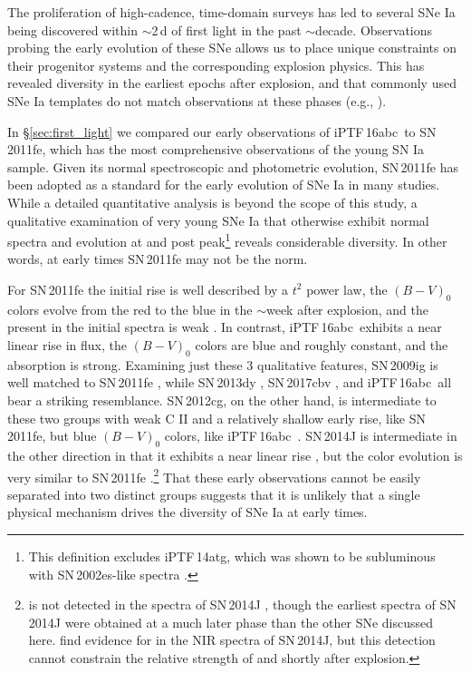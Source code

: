 \documentclass[twocolumn]{aastex61}
\newcommand{\abc}{iPTF\,16abc}
\begin{document}
The proliferation of high-cadence, time-domain surveys has led to several SNe
Ia being discovered within $\sim$2\,d of first light in the past $\sim$decade.
Observations probing the early evolution of these SNe allows us to place
unique constraints on their progenitor systems and the corresponding explosion
physics. This has revealed diversity in the earliest epochs after explosion,
and that commonly used SNe Ia templates do not match observations at these
phases (e.g., \citealt{2012ApJ...744...38F}).

In \S\ref{sec:first_light} we compared our early observations of \abc\ to
SN\,2011fe, which has the most comprehensive observations of the young SN Ia
sample. Given its normal spectroscopic and photometric evolution, SN\,2011fe
has been adopted as a standard for the early evolution of SNe Ia in many
studies. While a detailed quantitative analysis is beyond the scope of this
study, a qualitative examination of very young SNe Ia that otherwise exhibit
normal spectra and evolution at and post peak\footnote{This definition
excludes iPTF\,14atg, which was shown to be subluminous with SN\,2002es-like
spectra \citep{2015Natur.521..328C}.} reveals considerable diversity. In other
words, at early times SN\,2011fe may not be the norm.

For SN\,2011fe the initial rise is well described by a $t^2$ power law, the
$(B - V)_0$ colors evolve from the red to the blue in the $\sim$week after
explosion, and the  present in the initial spectra is weak
\citep{2011Natur.480..344N,2016ApJ...820...67Z,2012ApJ...752L..26P}. In
contrast, \abc\ exhibits a near linear rise in flux, the $(B - V)_0$ colors
are blue and roughly constant, and the  absorption is strong.
Examining just these 3 qualitative features, SN\,2009ig is well matched to
SN\,2011fe \citep{2012ApJ...744...38F}, while SN\,2013dy
\citep{2013ApJ...778L..15Z}, SN\,2017cbv \citep{2017ApJ...845L..11H}, and
\abc\ all bear a striking resemblance. SN\,2012cg, on the other hand, is
intermediate to these two groups with weak C II and a relatively shallow early
rise, like SN\,2011fe, but blue $(B - V)_0$ colors, like \abc\
\citep{2012ApJ...756L...7S,2016ApJ...820...92M}. SN\,2014J is intermediate in
the other direction in that it exhibits a near linear rise
\citep{2014ApJ...783L..24Z,2015ApJ...799..106G}, but the color evolution is
very similar to SN\,2011fe \citep{2014ApJ...788L..21A}.\footnote{\ion{C}{2} is
not detected in the spectra of SN\,2014J
\citep{2014ApJ...784L..12G,2014ApJ...783L..24Z}, though the earliest spectra
of SN\,2014J were obtained at a much later phase than the other SNe discussed
here. \citet{2015ApJ...798...39M} find evidence for \ion{C}{1} in the NIR
spectra of SN\,2014J, but this detection cannot constrain the relative
strength of \ion{C}{2} and \ion{Si}{2} shortly after explosion.} That these
early observations cannot be easily separated into two distinct groups
suggests that it is unlikely that a single physical mechanism drives the
diversity of SNe Ia at early times.
\end{document}
